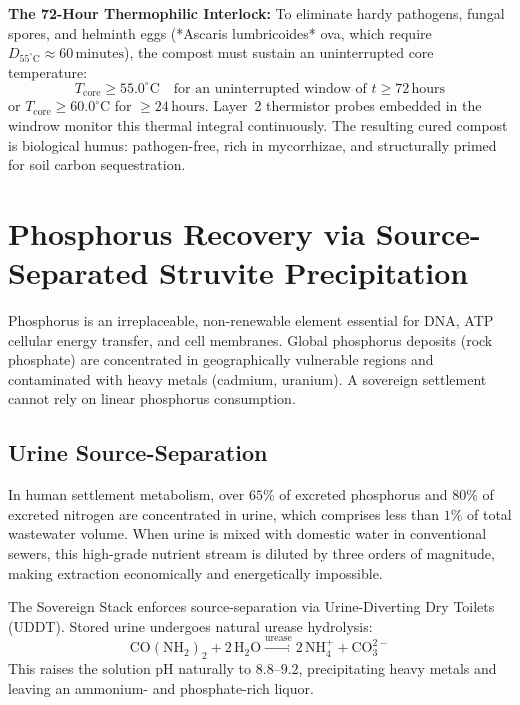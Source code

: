 \textbf{The 72-Hour Thermophilic Interlock:} To eliminate hardy pathogens, fungal spores, and helminth eggs (*Ascaris lumbricoides* ova, which require $D_{55^\circ\mathrm{C}} \approx 60\,\mathrm{minutes}$), the compost must sustain an uninterrupted core temperature:
\begin{equation}
T_{\mathrm{core}} \ge 55.0^\circ\mathrm{C} \quad \text{for an uninterrupted window of } t \ge 72\,\mathrm{hours}
\label{eq:compost_interlock}
\end{equation}
or $T_{\mathrm{core}} \ge 60.0^\circ\mathrm{C}$ for $\ge 24\,\mathrm{hours}$. Layer~2 thermistor probes embedded in the windrow monitor this thermal integral continuously. The resulting cured compost is biological humus: pathogen-free, rich in mycorrhizae, and structurally primed for soil carbon sequestration.

\section{Phosphorus Recovery via Source-Separated Struvite Precipitation}

Phosphorus is an irreplaceable, non-renewable element essential for DNA, ATP cellular energy transfer, and cell membranes. Global phosphorus deposits (rock phosphate) are concentrated in geographically vulnerable regions and contaminated with heavy metals (cadmium, uranium). A sovereign settlement cannot rely on linear phosphorus consumption.

\subsection{Urine Source-Separation}

In human settlement metabolism, over $65\%$ of excreted phosphorus and $80\%$ of excreted nitrogen are concentrated in urine, which comprises less than $1\%$ of total wastewater volume. When urine is mixed with domestic water in conventional sewers, this high-grade nutrient stream is diluted by three orders of magnitude, making extraction economically and energetically impossible.

The Sovereign Stack enforces source-separation via Urine-Diverting Dry Toilets (UDDT). Stored urine undergoes natural urease hydrolysis:
\begin{equation}
\mathrm{CO}(\mathrm{NH}_2)_2 + 2\,\mathrm{H}_2\mathrm{O} \xrightarrow{\text{urease}} 2\,\mathrm{NH}_4^+ + \mathrm{CO}_3^{2-}
\label{eq:urea_hydrolysis}
\end{equation}
This raises the solution pH naturally to $8.8$--$9.2$, precipitating heavy metals and leaving an ammonium- and phosphate-rich liquor.

